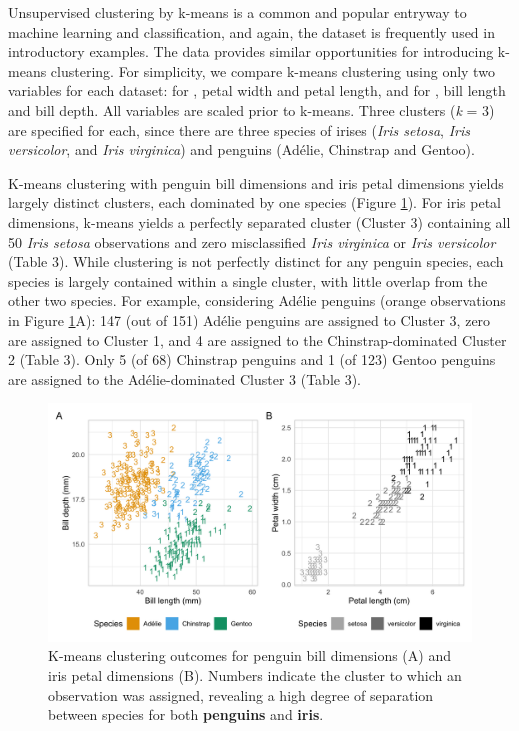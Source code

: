 Unsupervised clustering by k-means is a common and popular entryway to
machine learning and classification, and again, the  dataset
is frequently used in introductory examples. The  data
provides similar opportunities for introducing k-means clustering. For
simplicity, we compare k-means clustering using only two variables for
each dataset: for , petal width and petal length, and for
, bill length and bill depth. All variables are scaled
prior to k-means. Three clusters (\emph{k} = 3) are specified for each,
since there are three species of irises (\emph{Iris setosa}, \emph{Iris
versicolor}, and \emph{Iris virginica}) and penguins (Adélie, Chinstrap
and Gentoo).

K-means clustering with penguin bill dimensions and iris petal
dimensions yields largely distinct clusters, each dominated by one
species (Figure \ref{fig:kmeans}). For iris petal dimensions, k-means
yields a perfectly separated cluster (Cluster 3) containing all 50
\emph{Iris setosa} observations and zero misclassified \emph{Iris
virginica} or \emph{Iris versicolor} (Table 3). While clustering is not
perfectly distinct for any penguin species, each species is largely
contained within a single cluster, with little overlap from the other
two species. For example, considering Adélie penguins (orange
observations in Figure \ref{fig:kmeans}A): 147 (out of 151) Adélie
penguins are assigned to Cluster 3, zero are assigned to Cluster 1, and
4 are assigned to the Chinstrap-dominated Cluster 2 (Table 3). Only 5
(of 68) Chinstrap penguins and 1 (of 123) Gentoo penguins are assigned
to the Adélie-dominated Cluster 3 (Table 3).

\begin{Schunk}
\begin{figure}[htbp]

{\centering \includegraphics[width=\textwidth]{figs/kmeans-1} 

}

\caption[K-means clustering outcomes for penguin bill dimensions (A) and iris petal dimensions (B)]{K-means clustering outcomes for penguin bill dimensions (A) and iris petal dimensions (B). Numbers indicate the cluster to which an observation was assigned, revealing a high degree of separation between species for both \textbf{penguins} and \textbf{iris}.}\label{fig:kmeans}
\end{figure}
\end{Schunk}

